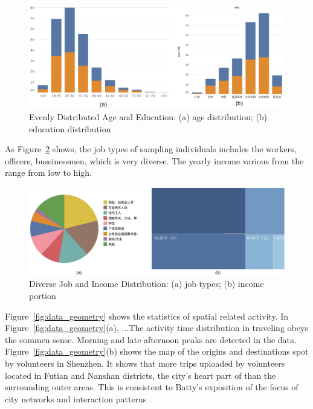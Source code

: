\begin{figure}[htb!]
 \centering %
 \includegraphics[width=\columnwidth]{pictures/data1}
 \caption{Evenly Distributed Age and Education: (a) age distribution; (b) education distribution}
 \label{fig:data_age_edu}
\end{figure}

As Figure~\ref{fig:data_job_inc} shows, the job types of sampling individuals includes the workers, officers, bussinessmen, which is very diverse. The yearly income various from the range from low to high.

\begin{figure}[htb!]
 \centering %
 \includegraphics[width=\columnwidth]{pictures/data2}
 \caption{Diverse Job and Income Distribution: (a) job types; (b) income portion}
 \label{fig:data_job_inc}
\end{figure}


Figure~\ref{fig:data_geometry} shows the statistics of spatial related activity. In Figure~\ref{fig:data_geometry}(a), ...The activity time distribution in traveling obeys the commen sense. Morning and late afternoon peaks are detected in the data. Figure~\ref{fig:data_geometry}(b) shows the map of the origins and destinations spot by volunteers in Shenzhen. It shows that more trips uploaded by volunteers located in Futian and Nanshan districts, the city's heart part of than the surrounding outer areas. This is consistent to Batty's exposition of the focus of city networks and interaction patterns~\cite{batty2013new}. 

